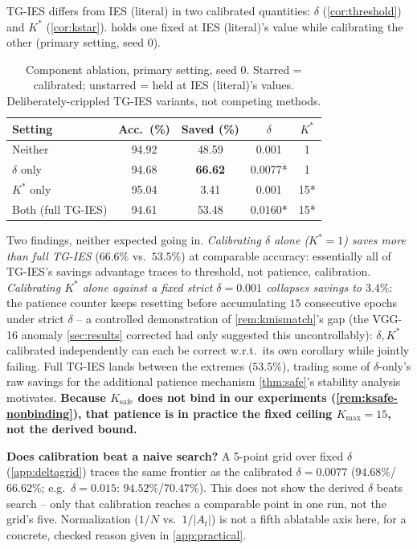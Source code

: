 \documentclass{article}
\theoremstyle{plain}
\theoremstyle{definition}
\theoremstyle{remark}
\begin{document}
TG-IES differs from IES (literal) in two calibrated quantities: $\delta$ (\cref{cor:threshold}) and $K^*$ (\cref{cor:kstar}).  holds one fixed at IES (literal)'s value while calibrating the other (primary setting, seed 0).

\begin{table}[h]
\caption{Component ablation, primary setting, seed 0. Starred = calibrated; unstarred = held at IES (literal)'s values. Deliberately-crippled TG-IES variants, not competing methods.}
\label{tab:ablation}
\centering
\small
\begin{tabular}{lcccc}
\toprule
Setting & Acc.\ (\%) & Saved (\%) & $\delta$ & $K^*$ \\
\midrule
Neither & 94.92 & 48.59 & 0.001 & 1 \\
$\delta$ only & 94.68 & \textbf{66.62} & 0.0077* & 1 \\
$K^*$ only & 95.04 & 3.41 & 0.001 & 15* \\
Both (full TG-IES) & 94.61 & 53.48 & 0.0160* & 15* \\
\bottomrule
\end{tabular}
\end{table}

Two findings, neither expected going in. \emph{Calibrating $\delta$ alone ($K^*{=}1$) saves more than full TG-IES} ($66.6\%$ vs.\ $53.5\%$) at comparable accuracy: essentially all of TG-IES's savings advantage traces to threshold, not patience, calibration. \emph{Calibrating $K^*$ alone against a fixed strict $\delta{=}0.001$ collapses savings to $3.4\%$}: the patience counter keeps resetting before accumulating $15$ consecutive epochs under strict $\delta$ -- a controlled demonstration of \cref{rem:kmismatch}'s gap (the VGG-16 anomaly \cref{sec:results} corrected had only suggested this uncontrollably): $\delta,K^*$ calibrated independently can each be correct w.r.t.\ its own corollary while jointly failing. Full TG-IES lands between the extremes ($53.5\%$), trading some of $\delta$-only's raw savings for the additional patience mechanism \cref{thm:safe}'s stability analysis motivates. \textbf{Because $K_{\mathrm{safe}}$ does not bind in our experiments (\cref{rem:ksafe-nonbinding}), that patience is in practice the fixed ceiling $K_{\max}=15$, not the derived bound.}

\textbf{Does calibration beat a naive search?} A 5-point grid over fixed $\delta$ (\cref{app:deltagrid}) traces the same frontier as the calibrated $\delta{=}0.0077$ ($94.68\%$/$66.62\%$; e.g.\ $\delta{=}0.015$: $94.52\%$/$70.47\%$). This does not show the derived $\delta$ beats search -- only that calibration reaches a comparable point in one run, not the grid's five. Normalization ($1/N$ vs.\ $1/|A_t|$) is not a fifth ablatable axis here, for a concrete, checked reason given in \cref{app:practical}.
\end{document}
